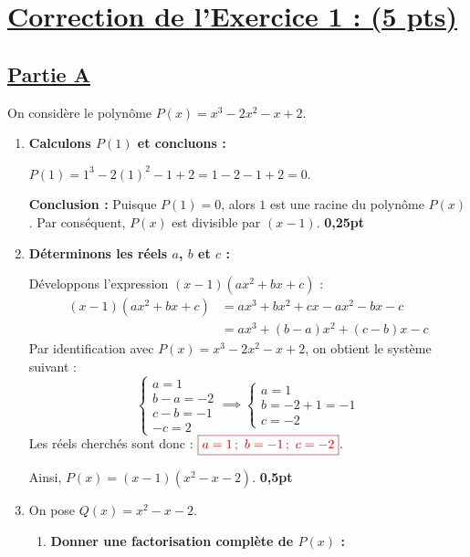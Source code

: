 \documentclass[12pt,a4paper]{article}
\newcommand{\redtitle}[1]{\textcolor{myred}{\textbf{#1}}}
\newcommand{\redbox}[1]{\color{myred}\boxed{#1}\color{black}}
\begin{document}
\section*{\underline{\redtitle{Correction de l'Exercice 1 : (5 pts)}}}

\subsection*{\underline{\redtitle{Partie A}}}

On considère le polynôme $P(x) = x^3 - 2x^2 - x + 2$.

\begin{enumerate}
    \item \textbf{Calculons $P(1)$ et concluons :}
    
    $P(1) = 1^3 - 2(1)^2 - 1 + 2 = 1 - 2 - 1 + 2 = 0$.
    
    \textbf{Conclusion :} Puisque $P(1) = 0$, alors $1$ est une racine du polynôme $P(x)$. Par conséquent, $P(x)$ est divisible par $(x - 1)$. \hfill \textbf{0,25pt}
    
    \item \textbf{Déterminons les réels $a$, $b$ et $c$ :}
    
    Développons l'expression $(x - 1)(ax^2 + bx + c)$ :
    \begin{align*}
        (x - 1)(ax^2 + bx + c) &= ax^3 + bx^2 + cx - ax^2 - bx - c \\
        &= ax^3 + (b - a)x^2 + (c - b)x - c
    \end{align*}
    Par identification avec $P(x) = x^3 - 2x^2 - x + 2$, on obtient le système suivant :
    \[
    \begin{cases}
        a = 1 \\
        b - a = -2 \\
        c - b = -1 \\
        -c = 2
    \end{cases}
    \implies
    \begin{cases}
        a = 1 \\
        b = -2 + 1 = -1 \\
        c = -2
    \end{cases}
    \]
    Les réels cherchés sont donc : $\redbox{a = 1 \,;~ b = -1 \,;~ c = -2}$.
    
    Ainsi, $P(x) = (x - 1)(x^2 - x - 2)$. \hfill \textbf{0,5pt}
    
    \item On pose $Q(x) = x^2 - x - 2$.
    \begin{enumerate}
        \item \textbf{Donner une factorisation complète de $P(x)$ :}
        

\end{enumerate}
\end{enumerate}
\end{document}
